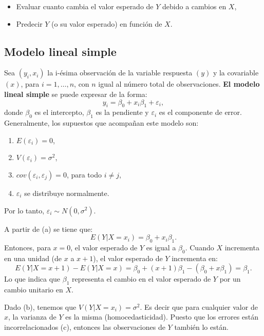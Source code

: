 \documentclass[
]{article}
\providecommand{\tightlist}{%
  \setlength{\itemsep}{0pt}\setlength{\parskip}{0pt}}
\begin{document}
\begin{itemize}
\tightlist
\item
  Evaluar cuanto cambia el valor esperado de \(Y\) debido a cambios en \(X\),
\item
  Predecir \(Y\) (o su valor esperado) en función de \(X\).
\end{itemize}

\hypertarget{modelo-lineal-simple-1}{%
\subsection{Modelo lineal simple}\label{modelo-lineal-simple-1}}

Sea \((y_{i},x_{i})\) la i-ésima observación de la variable respuesta \((y)\) y la covariable \((x)\), para \(i=1,\ldots,n\), con \(n\) igual al número total de observaciones. \textbf{El modelo lineal simple} se puede expresar de la forma:
\[
y_{i} = \beta_{0} + x_{i}\beta_{1}+\varepsilon_{i},
\]
donde \(\beta_{0}\) es el intercepto, \(\beta_{1}\) es la pendiente y \(\varepsilon_{i}\) es el componente de error. Generalmente, los supuestos que acompañan este modelo son:

\begin{enumerate}
\def\labelenumi{\alph{enumi}.}
\tightlist
\item
  \(E(\varepsilon_{i}) = 0\),
\item
  \(V(\varepsilon_{i}) = \sigma^{2}\),
\item
  \(cov(\varepsilon_{i},\varepsilon_{j}) = 0\), para todo \(i \neq j\),
\item
  \(\varepsilon_{i}\) se distribuye normalmente.
\end{enumerate}

Por lo tanto, \(\varepsilon_{i} \sim N(0,\sigma^{2})\).

A partir de (a) se tiene que:
\[
E(Y|X=x_i) = \beta_{0} + x_i\beta_{1}.
\]
Entonces, para \(x=0\), el valor esperado de \(Y\) es igual a \(\beta_0\). Cuando \(X\) incrementa en una unidad (de \(x\) a \(x+1\)), el valor esperado de \(Y\) incrementa en:
\[
E(Y|X=x+1) - E(Y|X=x) = \beta_{0} + (x+1)\beta_{1} - (\beta_{0} + x\beta_{1}) = \beta_{1}.
\]
Lo que indica que \(\beta_{1}\) representa el cambio en el valor esperado de \(Y\) por un cambio unitario en \(X\).

Dado (b), tenemos que \(V(Y|X=x_{i}) = \sigma^{2}\). Es decir que para cualquier valor de \(x\), la varianza de \(Y\) es la misma (homocedasticidad). Puesto que los errores están incorrelacionados (c), entonces las observaciones de \(Y\) también lo están.
\end{document}
